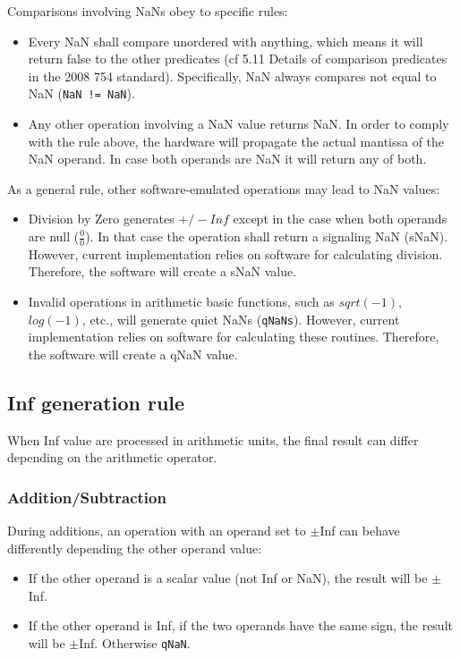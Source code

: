 Comparisons involving NaNs obey to specific rules:
\begin{itemize}[topsep=0pt]
    \item Every NaN shall compare unordered with anything, which means it will return false to the other predicates (cf 5.11 Details of comparison predicates in the 2008 754 standard).
        Specifically, NaN always compares not equal to NaN (\texttt{NaN != NaN}).
    \item Any other operation involving a NaN value returns NaN.
        In order to comply with the rule above, the hardware will propagate the actual mantissa of the NaN operand.
        In case both operands are NaN it will return any of both. 
\end{itemize}  

As a general rule, other software-emulated operations may lead to NaN values:
\begin{itemize}[topsep=0pt]
    \item Division by Zero generates $+/- Inf$ except in the case when both operands are null ($\frac{0}{0}$).
        In that case the operation shall return a signaling NaN (sNaN).
        However, current implementation relies on software for calculating division.
        Therefore, the software will create a sNaN value.
    \item Invalid operations in arithmetic basic functions, such as $sqrt(-1)$, $log(-1)$, etc., will generate quiet NaNs (\texttt{qNaNs}).
        However, current implementation relies on software for calculating these routines.
        Therefore, the software will create a qNaN value.
\end{itemize}

\subsection{Inf generation rule}

\label{sec:infgen}

When Inf value are processed in arithmetic units, the final result can differ depending on the arithmetic operator.

\subsubsection{Addition/Subtraction}

During additions, an operation with an operand set to $\pm$Inf can behave differently depending the other operand value:
\begin{itemize}[topsep=0pt]
    \item If the other operand is a scalar value (not Inf or NaN), the result will be $\pm$Inf.
    \item If the other operand is Inf, if the two operands have the same sign, the result will be $\pm$Inf. Otherwise \texttt{qNaN}.
\end{itemize}

